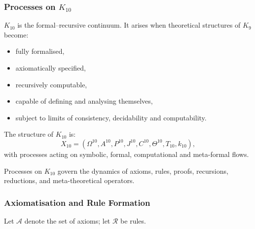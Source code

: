 

\subsubsection{Processes on $K_{10}$}
\label{sec:processes-k10}

$K_{10}$ is the formal–recursive continuum.  
It arises when theoretical structures of $K_{9}$ become:
\begin{itemize}
    \item fully formalised,
    \item axiomatically specified,
    \item recursively computable,
    \item capable of defining and analysing themselves,
    \item subject to limits of consistency, decidability and computability.
\end{itemize}

The structure of $K_{10}$ is:
\[
X_{10} = (\Omega^{10}, A^{10}, P^{10}, J^{10}, C^{10}, 
          \Theta^{10}, T_{10}, k_{10}),
\]
with processes acting on symbolic, formal, computational and meta-formal flows.

Processes on $K_{10}$ govern the dynamics of axioms, rules, proofs, 
recursions, reductions, and meta-theoretical operators.

\subsubsection{Axiomatisation and Rule Formation}

Let $\mathcal{A}$ denote the set of axioms; let $\mathcal{R}$ be rules.


